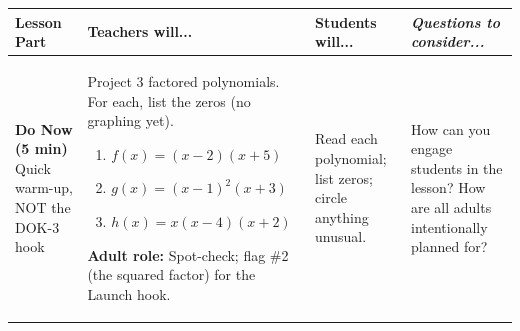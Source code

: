 \documentclass[11pt]{article}
\begin{document}
\noindent
\begin{xltabular}{\textwidth}{|p{1.15in}|p{2.1in}|p{1.6in}|p{0.95in}|}
\hline
\textbf{Lesson Part} & \textbf{Teachers will...} & \textbf{Students will...} & \textit{Questions to consider...} \\
\hline
\endhead

\textbf{Do Now (5 min)} \newline\newline Quick warm-up, NOT the DOK-3 hook &
Project 3 factored polynomials. For each, list the zeros (no graphing yet).
\scriptsize
\begin{enumerate}[label=\arabic*., leftmargin=*, nosep]
    \item $f(x) = (x-2)(x+5)$ \quad [zeros: $2, -5$]
    \item $g(x) = (x-1)^2(x+3)$ \quad [zeros: $1, -3$]
    \item $h(x) = x(x-4)(x+2)$ \quad [zeros: $0, 4, -2$]
\end{enumerate} \normalsize
\textbf{Adult role:} Spot-check; flag \#2 (the squared factor) for the Launch hook. &
Read each polynomial; list zeros; circle anything unusual. &
How can you engage students in the lesson? \newline\newline
How are all adults intentionally planned for? \\
\hline


\end{xltabular}
\end{document}
